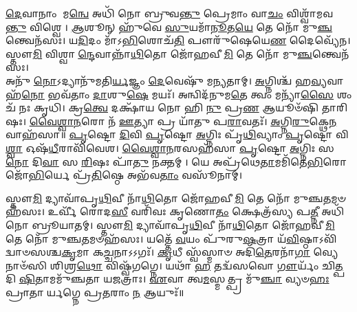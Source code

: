 \-\ul{𑌦𑍇}\-𑌵𑌾𑌨𑌾𑌂 𑌮\-\ul{𑌨𑍍𑌵𑍇} 𑌅𑌧𑌿᳴ 𑌨𑍋 𑌬𑍍𑌰𑍁𑌵\-\ul{𑌨𑍍𑌤𑍁} 𑌪𑍍𑌰𑍇𑌮𑌾𑌂 𑌵𑌾\-\ul{𑌚𑌂} 𑌵𑌿𑌶𑍍𑌵𑌾᳴𑌮𑌵\-\ul{𑌨𑍍𑌤𑍁} 𑌵𑌿𑌶𑍍𑌵𑍇। \ul{𑌆}\-𑌶𑍂𑌨𑍍 𑌹𑍁᳴𑌵𑍇 \ul{𑌸𑍁}\-𑌯𑌮𑌾᳴\-\ul{𑌨𑍂}\-𑌤\-\ul{𑌯𑍇} 𑌤𑍇 𑌨𑍋᳴ 𑌮𑍁\-\ul{𑌞𑍍𑌚}\-𑌨𑍍𑌤𑍍𑌵𑍇𑌨᳴𑌸𑌃। 𑌯\-\ul{𑌦𑌿}\-𑌦𑌂 𑌮𑌾᳴𑌽\-\ul{𑌭𑌿}\-𑌶𑍋𑌚᳴\-\ul{𑌤𑌿} 𑌪𑍗𑌰𑍁᳴𑌷𑍇𑌯𑍇\-\ul{𑌣} 𑌦𑍈𑌵𑍍𑌯𑍇᳴𑌨। 𑌸𑍍𑌤𑍗\-\ul{𑌮𑌿} 𑌵𑌿𑌶𑍍𑌵𑌾\-\ul{𑌨𑍍𑌦𑍇}\-𑌵𑌾𑌨𑍍𑌨𑌾᳴\-\ul{𑌥𑌿}\-𑌤𑍋 𑌜𑍋᳴𑌹𑌵𑍀\-\ul{𑌮𑌿} 𑌤𑍇 𑌨𑍋᳴ 𑌮𑍁\-\ul{𑌞𑍍𑌚}\-𑌨𑍍𑌤𑍍𑌵𑍇𑌨᳴𑌸𑌃।\\
𑌅𑌨𑍁᳴ \ul{𑌨𑍋}\-𑌽𑌦𑍍𑌯𑌾𑌨𑍁᳴𑌮𑌤𑌿\-\ul{𑌰𑍍𑌯}\-𑌜𑍍𑌞𑌂 \ul{𑌦𑍇}\-𑌵𑍇𑌷𑍁᳴ 𑌮𑌨𑍍𑌯𑌤𑌾𑌮𑍍। \ul{𑌅}\-𑌗𑍍𑌨𑌿𑌶𑍍𑌚᳴ 𑌹\-\ul{𑌵𑍍𑌯}\-𑌵𑌾𑌹᳴\-\ul{𑌨𑍋} 𑌭𑌵᳴𑌤𑌾𑌂 \ul{𑌦𑌾}\-𑌶𑍁\-\ul{𑌷𑍇} 𑌮𑌯𑌃᳴। 𑌅𑌨𑍍𑌵𑌿𑌦᳴𑌨𑍁𑌮\-\ul{𑌤𑍇} 𑌤𑍍𑌵𑌂 𑌮𑌨𑍍𑌯𑌾᳴\-\ul{𑌸𑍈} 𑌶𑌂 𑌚᳴ 𑌨𑌃 𑌕𑍃𑌧𑌿। 𑌕𑍍𑌰\-\ul{𑌤𑍍𑌵𑍇} 𑌦𑌕𑍍𑌷𑌾᳴𑌯 𑌨𑍋 𑌹𑌿 \ul{𑌨𑍁} 𑌪𑍍𑌰\-\ul{𑌣} 𑌆𑌯𑍂𑍞᳴𑌷𑌿 𑌤𑌾𑌰𑌿𑌷𑌃।
\-\ul{𑌵𑍈}\-\-\ul{𑌶𑍍𑌵𑌾}\-\-\ul{𑌨}\-𑌰𑍋 𑌨᳴ \ul{𑌊}\-𑌤𑍍𑌯𑌾 𑌪𑍍𑌰 𑌯𑌾᳴𑌤𑍁  𑌪\-\ul{𑌰𑌾}\-𑌵𑌤𑌃᳴। \ul{𑌅}\-𑌗𑍍𑌨𑌿\-\ul{𑌰𑍁}\-𑌕𑍍𑌥𑍇\-\ul{𑌨} 𑌵𑌾𑌹᳴𑌸𑌾॥
\-\ul{𑌪𑍃}\-𑌷𑍍𑌟𑍋 \ul{𑌦𑌿}\-𑌵𑌿 \ul{𑌪𑍃}\-𑌷𑍍𑌟𑍋 \ul{𑌅}\-𑌗𑍍𑌨𑌿𑌃 𑌪𑍃᳴\-\ul{𑌥𑌿}\-𑌵𑍍𑌯𑌾𑌂 \ul{𑌪𑍃}\-𑌷𑍍𑌟𑍋 𑌵𑌿\-\ul{𑌶𑍍𑌵𑌾} 𑌓𑌷᳴\-\ul{𑌧𑍀}\-𑌰𑌾𑌵𑌿᳴𑌵𑍇𑌶। \ul{𑌵𑍈}\-\-\ul{𑌶𑍍𑌵𑌾}\-\-\ul{𑌨}\-𑌰𑌸𑌹᳴𑌸𑌾 \ul{𑌪𑍃}\-𑌷𑍍𑌟𑍋 \ul{𑌅}\-𑌗𑍍𑌨𑌿𑌃 𑌸 \ul{𑌨𑍋} 𑌦𑌿\-\ul{𑌵𑌾} 𑌸 \ul{𑌰𑌿}\-𑌷𑌃 𑌪𑌾᳴\-\ul{𑌤𑍁} 𑌨𑌕𑍍𑌤𑌮𑍍।  𑌯𑍇 𑌅𑌪𑍍𑌰᳴𑌥𑍇\-\ul{𑌤𑌾}\-𑌮𑌮𑌿᳴𑌤𑍇\-\ul{𑌭𑌿}\-𑌰𑍋𑌜𑍋᳴\-\ul{𑌭𑌿}\-𑌰𑍍𑌯𑍇 𑌪𑍍𑌰᳴\-\ul{𑌤𑌿}\-𑌷𑍍𑌠𑍇 𑌅𑌭᳴𑌵\-\ul{𑌤𑌾𑌂} 𑌵𑌸𑍂᳴𑌨𑌾𑌮𑍍। 

𑌸𑍍𑌤𑍗\-\ul{𑌮𑌿} 𑌦𑍍𑌯𑌾𑌵𑌾᳴𑌪𑍃\-\ul{𑌥𑌿}\-𑌵𑍀 𑌨𑌾᳴\-\ul{𑌥𑌿}\-𑌤𑍋 𑌜𑍋᳴𑌹𑌵𑍀\-\ul{𑌮𑌿} 𑌤𑍇 𑌨𑍋᳴ 𑌮𑍁𑌞𑍍𑌚\-\ul{𑌤}\-𑌮𑍞𑌹᳴𑌸𑌃। 𑌉𑌰𑍍𑌵𑍀᳴ 𑌰𑍋𑌦\-\ul{𑌸𑍀} 𑌵𑌰𑌿᳴𑌵𑌃 𑌕𑍃𑌣𑍋\-\ul{𑌤𑌂} 𑌕𑍍𑌷𑍇𑌤𑍍𑌰᳴𑌸𑍍𑌯 𑌪\-\ul{𑌤𑍍𑌨𑍀} 𑌅𑌧𑌿᳴ 𑌨𑍋 𑌬𑍍𑌰𑍂𑌯𑌾𑌤𑌮𑍍। 
𑌸𑍍𑌤𑍗\-\ul{𑌮𑌿} 𑌦𑍍𑌯𑌾𑌵𑌾᳴𑌪𑍃\-\ul{𑌥𑌿}\-𑌵𑍀 𑌨𑌾᳴\-\ul{𑌥𑌿}\-𑌤𑍋 𑌜𑍋᳴𑌹𑌵𑍀\-\ul{𑌮𑌿} 𑌤𑍇 𑌨𑍋᳴ 𑌮𑍁𑌞𑍍𑌚\-\ul{𑌤}\-𑌮𑍞𑌹᳴𑌸𑌃। 𑌯𑌤𑍍𑌤𑍇᳴ \ul{𑌵}\-𑌯𑌂 𑌪𑍁᳴𑌰𑍁\-\ul{𑌷}\-𑌤𑍍𑌰𑌾 𑌯᳴\-\ul{𑌵𑌿}\-𑌷𑍍𑌠𑌾𑌽𑌵𑌿᳴𑌦𑍍𑌵𑌾𑍞𑌸𑌶𑍍𑌚\-\ul{𑌕𑍃}\-𑌮𑌾 𑌕\-\ul{𑌚𑍍𑌚}\-𑌨𑌾𑌽𑌽𑌗𑌃᳴। 
\-\ul{𑌕𑍃}\-𑌧𑍀 𑌸𑍍𑌵᳴𑌸𑍍𑌮𑌾𑍞 𑌅𑌦𑌿᳴\-\ul{𑌤𑍇}\-𑌰𑌨𑌾᳴\-\ul{𑌗𑌾} 𑌵𑍍𑌯𑍇𑌨𑌾𑍞᳴𑌸𑌿 𑌶𑌿𑌶𑍍𑌰\-\ul{𑌥𑍋} 𑌵𑌿𑌷𑍍𑌵᳴𑌗𑌗𑍍𑌨𑍇। 𑌯𑌥𑌾᳴ \ul{𑌹} 𑌤𑌦𑍍𑌵᳴𑌸𑌵𑍋 \ul{𑌗𑍗}\-𑌰𑍍𑌯𑌂᳴ 𑌚𑌿\-\ul{𑌤𑍍𑌪}\-𑌦𑌿 \ul{𑌷𑌿}\-𑌤𑌾𑌮𑌮𑍁᳴𑌞𑍍𑌚𑌤𑌾 𑌯𑌜𑌤𑍍𑌰𑌾𑌃। \ul{𑌏}\-𑌵𑌾 𑌤𑍍𑌵\-\ul{𑌮}\-𑌸𑍍𑌮𑌤𑍍𑌪𑍍𑌰 𑌮𑍁᳴\-\ul{𑌞𑍍𑌚𑌾} 𑌵𑍍𑌯𑍞\-\ul{𑌹𑌃} 𑌪𑍍𑌰𑌾𑌤𑌾𑌰𑍍𑌯𑌗𑍍𑌨𑍇 𑌪𑍍𑌰\-\ul{𑌤}\-𑌰𑌾𑌂 \ul{𑌨} 𑌆𑌯𑍁𑌃᳴॥

